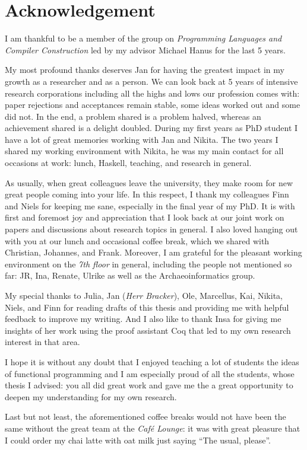 %
\chapter*{Acknowledgement}
\label{sec:acknowledgement}
\vspace*{-10mm}

I am thankful to be a member of the group on \emph{Programming Languages and Compiler Construction} led by my advisor Michael Hanus for the last 5 years.

My most profound thanks deserves Jan for having the greatest impact in my growth as a researcher and as a person.
We can look back at 5 years of intensive research corporations including all the highs and lows our profession comes with: paper rejections and acceptances remain stable, some ideas worked out and some did not.
In the end, a problem shared is a problem halved, whereas an achievement shared is a delight doubled.
During my first years as PhD student I have a lot of great memories working with Jan and Nikita.
The two years I shared my working environment with Nikita, he was my main contact for all occasions at work: lunch, Haskell, teaching, and research in general.

As usually, when great colleagues leave the university, they make room for new great people coming into your life.
In this respect, I thank my colleagues Finn and Niels for keeping me sane, especially in the final year of my PhD.
It is with first and foremost joy and appreciation that I look back at our joint work on papers and discussions about research topics in general.
I also loved hanging out with you at our lunch and occasional coffee break, which we shared with Christian, Johannes, and Frank.
Moreover, I am grateful for the pleasant working environment on the \emph{7th floor} in general, including the people not mentioned so far: JR, Ina, Renate, Ulrike as well as the Archaeoinformatics group.

My special thanks to Julia, Jan (\emph{Herr Bracker}), Ole, Marcellus, Kai, Nikita, Niels, and Finn for reading drafts of this thesis and providing me with helpful feedback to improve my writing.
And I also like to thank Insa for giving me insights of her work using the proof assistant Coq that led to my own research interest in that area.

I hope it is without any doubt that I enjoyed teaching a lot of students the ideas of functional programming and I am especially proud of all the students, whose thesis I advised: you all did great work and gave me the a great opportunity to deepen my understanding for my own research.

Last but not least, the aforementioned coffee breaks would not have been the same without the great team at the \emph{Caf\'e Lounge}: it was with great pleasure that I could order my chai latte with oat milk just saying ``The usual, please''.